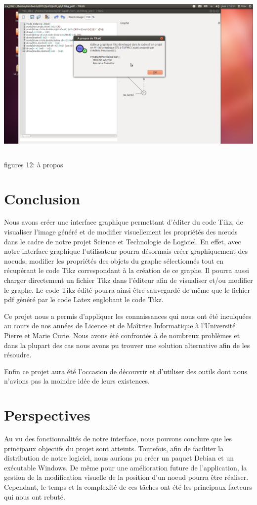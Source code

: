 \documentclass[a4paper]{report}
\begin{document}
  \includegraphics[width=15cm, height=9cm]{img/r7.png}
\\ 
figures 12: à propos
\chapter{Conclusion}
Nous avons créer une interface graphique permettant d'éditer du code Tikz, de visualiser l'image généré et de modifier visuellement les propriétés des n{\oe}uds dans le cadre de notre projet Science et Technologie de Logiciel. En effet, avec notre interface graphique l'utilisateur pourra désormais créer graphiquement des noeuds, modifier les propriétés des objets du graphe sélectionnés tout en récupérant le code Tikz correspondant à la création de ce graphe. Il pourra aussi charger directement un fichier Tikz dans l'éditeur afin de visualiser et/ou modifier le graphe. Le code Tikz édité pourra ainsi être sauvegardé de même que le fichier pdf généré par le code Latex englobant le code Tikz. 

Ce projet nous a permis d’appliquer les connaissances qui nous ont été inculquées au cours
de nos années de Licence et de Maîtrise Informatique à l’Université Pierre et Marie Curie. Nous avons été confrontés à de nombreux problèmes et dans la plupart des cas nous avons pu trouver une solution alternative afin de les résoudre.

Enfin ce projet aura été l’occasion de découvrir et d’utiliser des outils dont nous n’avions pas la
moindre idée de leurs existences.



\chapter{Perspectives}
Au vu des fonctionnalités de notre interface, nous pouvons conclure que les principaux objectifs du projet sont atteints. Toutefois, afin de faciliter la distribution de notre logiciel, nous aurions pu créer un paquet Debian et un exécutable Windows. De même pour une amélioration future de l'application, la gestion de la modification visuelle de la position d'un noeud pourra être réaliser. Cependant, le temps et la
complexité de ces tâches ont été les principaux facteurs qui nous ont rebuté. 
\end{document}
